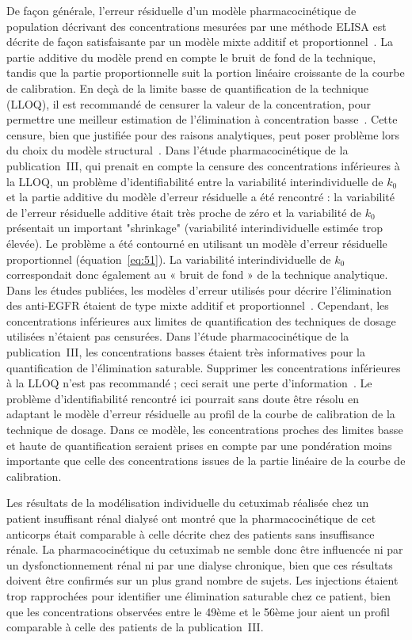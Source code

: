 De façon générale, l'erreur résiduelle d'un modèle pharmacocinétique de population décrivant des concentrations mesurées par une méthode ELISA est décrite de façon satisfaisante par un modèle mixte additif et proportionnel~\citep{REF68, REF73}. La partie additive du modèle prend en compte le bruit de fond de la technique, tandis que la partie proportionnelle suit la portion linéaire croissante de la courbe de calibration. En deçà de la limite basse de quantification de la technique (LLOQ), il est recommandé de censurer la valeur de la concentration, pour permettre une meilleur estimation de l'élimination à concentration basse~\citep{REF142}. Cette censure, bien que justifiée pour des raisons analytiques, peut poser problème lors du choix du modèle structural~\citep{REF143}. Dans l'étude pharmacocinétique de la publication~III, qui prenait en compte la censure des concentrations inférieures à la LLOQ, un problème d'identifiabilité entre la variabilité interindividuelle de $k_0$ et la partie additive du modèle d'erreur résiduelle a été rencontré : la variabilité de l'erreur résiduelle additive était très proche de zéro et la variabilité de $k_0$ présentait un important "shrinkage" (variabilité interindividuelle estimée trop élevée). Le problème a été contourné en utilisant un modèle d'erreur résiduelle proportionnel (équation~\ref{eq:51}). La variabilité interindividuelle de $k_0$ correspondait donc également au « bruit de fond » de la technique analytique. Dans les études publiées, les modèles d'erreur utilisés pour décrire l'élimination des anti-EGFR étaient de type mixte additif et proportionnel~\citep{REF68, REF73}. Cependant, les concentrations inférieures aux limites de quantification des techniques de dosage utilisées n'étaient pas censurées. Dans l'étude pharmacocinétique de la publication~III, les concentrations basses étaient très informatives pour la quantification de l'élimination saturable. Supprimer les concentrations inférieures à la LLOQ n'est pas recommandé ; ceci serait une perte d'information~\citep{REF142}. Le problème d'identifiabilité rencontré ici pourrait sans doute être résolu en adaptant le modèle d'erreur résiduelle au profil de la courbe de calibration de la technique de dosage. Dans ce modèle, les concentrations proches des limites basse et haute de quantification seraient prises en compte par une pondération moins importante que celle des concentrations issues de la partie linéaire de la courbe de calibration.

Les résultats de la modélisation individuelle du cetuximab réalisée chez un patient insuffisant rénal dialysé ont montré que la pharmacocinétique de cet anticorps était comparable à celle décrite chez des patients sans insuffisance rénale. La pharmacocinétique du cetuximab ne semble donc être influencée ni par un dysfonctionnement rénal ni par une dialyse chronique, bien que ces résultats doivent être confirmés sur un plus grand nombre de sujets. Les injections étaient trop rapprochées pour identifier une élimination saturable chez ce patient, bien que les concentrations observées entre le 49ème et le 56ème jour aient un profil comparable à celle des patients de la publication~III.

